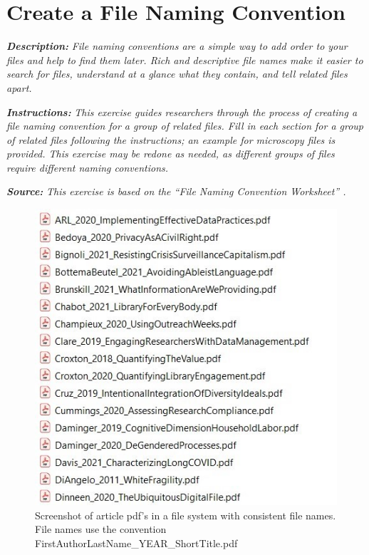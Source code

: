 \documentclass[
]{book}
\begin{document}
\hypertarget{file-naming}{%
\section{Create a File Naming Convention}\label{file-naming}}

\textbf{\emph{Description:}} \emph{File naming conventions are a simple way to add order to your files and help to find them later. Rich and descriptive file names make it easier to search for files, understand at a glance what they contain, and tell related files apart.}

\textbf{\emph{Instructions:}} \emph{This exercise guides researchers through the process of creating a file naming convention for a group of related files. Fill in each section for a group of related files following the instructions; an example for microscopy files is provided. This exercise may be redone as needed, as different groups of files require different naming conventions.}

\textbf{\emph{Source:}} \emph{This exercise is based on the ``File Naming Convention Worksheet'' \citep{briney_file_2020}.}

\begin{figure}
\centering
\includegraphics{images/03_FileNaming.jpg}
\caption{Screenshot of article pdf's in a file system with consistent file names. File names use the convention FirstAuthorLastName\_YEAR\_ShortTitle.pdf}
\end{figure}
\end{document}
